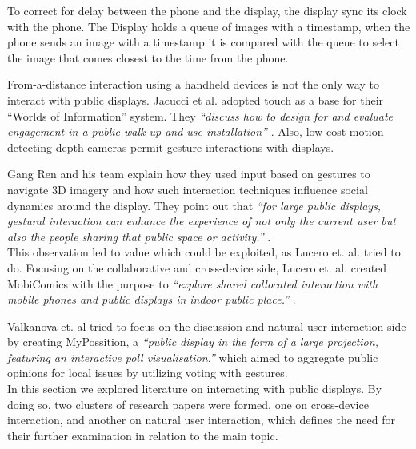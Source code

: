 To correct for delay between the phone and the display, the display sync
its clock with the phone. The Display holds a queue of images with a
timestamp, when the phone sends an image with a timestamp it
is compared with the queue to select the image that comes closest to
the time from the phone.


From-a-distance interaction using a handheld devices is not the only way to interact with public displays. 
Jacucci et al. adopted touch as a base for their ``Worlds of Information'' system. 
They \emph{``discuss how to design for and evaluate engagement in a public walk-up-and-use installation''} \cite{Jacucci:2010}. 
Also, low-cost motion detecting depth cameras permit gesture interactions with displays. 

Gang Ren and his team explain how they used input based on gestures to navigate 3D imagery and how such interaction techniques influence social dynamics around the display. 
They point out that\emph{ ``for large public displays, gestural interaction can enhance the experience of not only the current user but also the people sharing that public space or activity.''} \cite{Ren:2013}.\\

This observation led to value which could be exploited, as Lucero et. al. tried to do. 
Focusing on the collaborative and cross-device side, Lucero et. al. created MobiComics with the purpose to \emph{``explore shared collocated interaction with mobile phones and public displays in indoor public place.''} \cite{Lucero:2012}. 

Valkanova et. al tried to focus on the discussion and natural user interaction side by creating MyPossition, a \emph{``public display in the form of a large projection, featuring an interactive poll visualisation.''} \cite{Valkanova:2014} which aimed to aggregate public opinions for local issues by utilizing voting with gestures.\\

In this section we explored literature on interacting with public displays. 
By doing so, two clusters of research papers were formed, one on cross-device interaction, and another on natural user interaction, which defines the need for their further examination in relation to the main topic.

